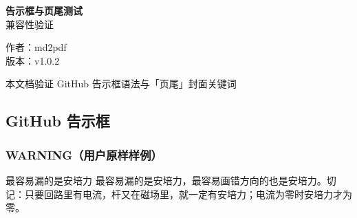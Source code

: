 \documentclass[zihao=-4]{ctexart}
\numberwithin{equation}{section}
\numberwithin{figure}{section}
\numberwithin{table}{section}
\theoremstyle{plain}
\begin{document}
\begin{titlepage}

\pagecolor{coverbg}

\thispagestyle{empty}

\color{black}

\centering

\vspace*{0.30\textheight}

{\bfseries 告示框与页尾测试}\\[0.9em]

{ 兼容性验证}\\[3.2em]

\vfill

{ 作者：md2pdf}\\[0.7em]

{ 版本：v1.0.2}\\[0.7em]

\vspace{0.5em}

\vfill

{\color{black!70} 本文档验证 GitHub 告示框语法与「页尾」封面关键词}\\[1.0em]

\vspace*{1.1cm}

\end{titlepage}

\nopagecolor

\setcounter{page}{1}


\tableofcontents

\clearpage


\setcounter{page}{1}

\subsection{GitHub 告示框}

\subsubsection{WARNING（用户原样样例）}

\begin{warnbox}[警告]
最容易漏的是安培力 最容易漏的是安培力，最容易画错方向的也是安培力。切记：只要回路里有电流，杆又在磁场里，就一定有安培力；电流为零时安培力才为零。
\end{warnbox}
\end{document}
